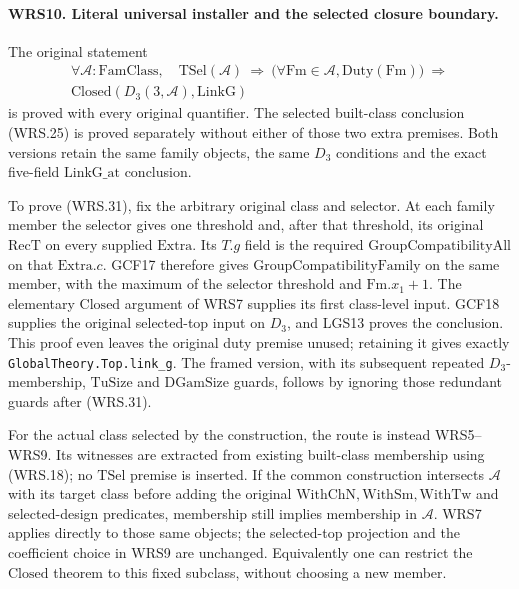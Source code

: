 \paragraph{WRS10. Literal universal installer and the selected closure boundary.}
\label{claim:WRS10}
The original statement
\[
 \begin{gathered}
 \forall\mathcal A:\mathrm{FamClass},\quad
 \mathrm{TSel}(\mathcal A)\ \Longrightarrow\
 \bigl(\forall\mathrm{Fm}\in\mathcal A,
                         \mathrm{Duty}(\mathrm{Fm})\bigr)
       \ \Longrightarrow\\
 \mathrm{Closed}(D_3(3,\mathcal A),\mathrm{LinkG})
 \end{gathered}                                                   \tag{WRS.31}
\]
is proved with every original quantifier.  The selected built-class
conclusion (WRS.25) is proved separately without either of those
two extra premises.  Both versions retain the same family objects,
the same \(D_3\) conditions and the exact five-field
\(\mathrm{LinkG\_at}\) conclusion.

To prove (WRS.31), fix the arbitrary original class and selector.
At each family member the selector gives one threshold and, after
that threshold, its original \(\mathrm{RecT}\) on every supplied
\(\mathrm{Extra}\).  Its \(T.g\) field is the required
\(\mathrm{GroupCompatibilityAll}\) on that \(\mathrm{Extra}.c\).
GCF17 therefore gives \(\mathrm{GroupCompatibilityFamily}\)
on the same member, with the maximum of the selector threshold
and \(\mathrm{Fm}.x_1+1\).  The elementary \(\mathrm{Closed}\)
argument of WRS7 supplies its first class-level input.
GCF18 supplies the original selected-top input on \(D_3\),
and LGS13 proves the conclusion.  This proof even leaves the
original duty premise unused; retaining it gives exactly
\texttt{GlobalTheory.Top.link\_g}.  The framed version, with
its subsequent repeated \(D_3\)-membership,
\(\mathrm{TuSize}\) and \(\mathrm{DGamSize}\) guards, follows
by ignoring those redundant guards after (WRS.31).

For the actual class selected by the construction, the route is
instead WRS5--WRS9.  Its witnesses are extracted from existing
built-class membership using (WRS.18); no \(\mathrm{TSel}\)
premise is inserted.  If the common construction intersects
\(\mathcal A\) with its target class before adding the original
\(\mathrm{WithChN},\mathrm{WithSm},\mathrm{WithTw}\) and
selected-design predicates, membership still implies membership
in \(\mathcal A\).  WRS7 applies directly to those same objects;
the selected-top projection and the coefficient choice in WRS9
are unchanged.  Equivalently one can restrict the \(\mathrm{Closed}\)
theorem to this fixed subclass, without choosing a new member.

